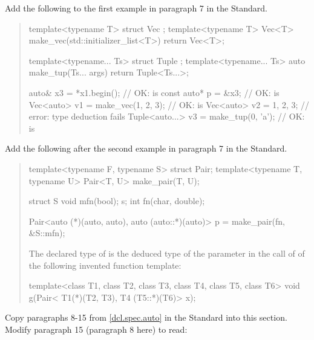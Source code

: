 Add the following to the first example in paragraph 7 in the \Cpp Standard.

\begin{quote}
\begin{addedblock}
\enterexample
\begin{codeblock}
template<typename T> struct Vec { };
template<typename T> Vec<T> make_vec(std::initializer_list<T>) { return Vec<T>{}; }

template<typename... Ts> struct Tuple { };
template<typename... Ts> auto make_tup(Ts... args) { return Tuple<Ts...>{}; }

auto& x3 = *x1.begin();               // OK:  is 
const auto* p = &x3;                  // OK:  is 
Vec<auto> v1 = make_vec({1, 2, 3});   // OK:  is 
Vec<auto> v2 = {1, 2, 3};             // error: type deduction fails
Tuple<auto...> v3 = make_tup(0, 'a'); // OK:  is 
\end{codeblock}
\exitexample
\end{addedblock}
\end{quote}


Add the following after the second example in paragraph 7 in the \Cpp Standard.

\begin{quote}
\begin{addedblock}
\enterexample
\begin{codeblock}
template<typename F, typename S> struct Pair;
template<typename T, typename U> Pair<T, U> make_pair(T, U);

struct S { void mfn(bool); } s;
int fn(char, double);

Pair<auto (*)(auto, auto), auto (auto::*)(auto)> p = make_pair(fn, &S::mfn);
\end{codeblock}
The declared type of  is the deduced type of the parameter 
 in the call of  of the following 
invented function template:
\begin{codeblock}
template<class T1, class T2, class T3, class T4, class T5, class T6>
void g(Pair< T1(*)(T2, T3), T4 (T5::*)(T6)> x);
\end{codeblock}
\exitexample
\end{addedblock}
\end{quote}

Copy paragraphs 8-15 from \ref{dcl.spec.auto} in the \Cpp Standard into
this section. Modify paragraph 15 (paragraph 8 here) to read:


